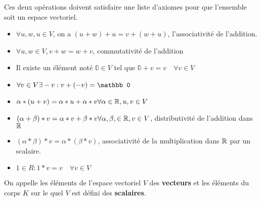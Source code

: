 \documentclass[12pt]{article}
\begin{document}
Ces deux opérations doivent satisfaire une liste d'axiomes pour que l'ensemble soit un espace vectoriel.
\begin{itemize}
    \item $\forall u,w,u \in V$, on a $(u+w)+u=v+(w+u)$, l'associativité de l'addition.
    \item $\forall u,w \in V, v+w = w+v$, commutativité de l'addition
    \item Il existe un élément noté $\mathbb 0 \in V$ tel que $\mathbb 0 +v = v \quad \forall v \in V$    
    \item $\forall v \in V \space \exists -v : v + (-v) = \mathbb 0$
    \item $\alpha * (u+v) = \alpha*u+\alpha*v \space \forall \alpha \in \mathbb{R}, u,v \in V$
    \item $(\alpha + \beta) * v = \alpha * v + \beta * v \space \forall \alpha, \beta, \in \mathbb{R}, v \in V$, distributivité de l'addition dans $\mathbb{R}$
    \item $(\alpha*\beta)*v=\alpha*(\beta*v)$, associativité de la multiplication dans $\mathbb{R}$ par un scalaire.
    \item $1 \in R : 1*v=v \quad \forall v \in V$ 
\end{itemize}

On appelle les éléments de l'espace vectoriel $V$ des \textbf{vecteurs} et les éléments du corps $K$ sur le quel $V$ est défini des \textbf{scalaires}.
\end{document}

